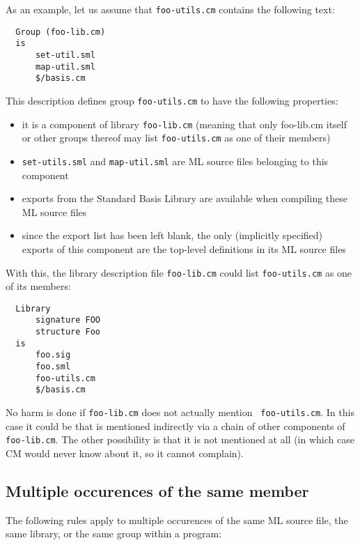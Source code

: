 As an example, let us assume that
{\tt foo-utils.cm} contains the following text:

\begin{verbatim}
  Group (foo-lib.cm)
  is
      set-util.sml
      map-util.sml
      $/basis.cm
\end{verbatim}

This description defines group {\tt foo-utils.cm} to have the
following properties:

\begin{itemize}
\item it is a component of library {\tt foo-lib.cm} (meaning that only
foo-lib.cm itself or other groups thereof may list {\tt foo-utils.cm} as one
of their members)
\item {\tt set-utils.sml} and {\tt map-util.sml} are ML source files
belonging to this component
\item exports from the Standard Basis Library are available when
compiling these ML source files
\item since the export list has been left blank, the only (implicitly
specified) exports of this component are the top-level definitions in
its ML source files
\end{itemize}

With this, the library description file {\tt foo-lib.cm} could list
{\tt foo-utils.cm} as one of its members:

\begin{verbatim}
  Library
      signature FOO
      structure Foo
  is
      foo.sig
      foo.sml
      foo-utils.cm
      $/basis.cm
\end{verbatim}

No harm is done if {\tt foo-lib.cm} does not actually mention {\tt
foo-utils.cm}.  In this case it could be that is mentioned indirectly via a chain of other components
of {\tt foo-lib.cm}.  The other possibility is that it is not
mentioned at all (in which case CM would never know about it, so it
cannot complain).

\subsection{Multiple occurences of the same member}
\label{sec:multioccur}

The following rules apply to multiple occurences of the same ML source
file, the same library, or the same group within a program:

